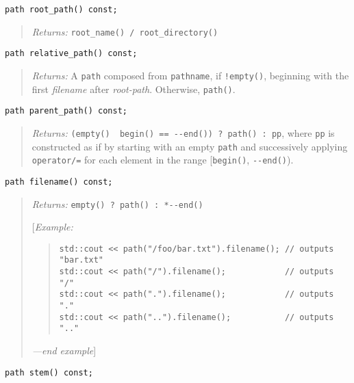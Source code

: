 \begin{verbatim}
path root_path() const;
\end{verbatim}

\begin{quote}
\emph{Returns:} \texttt{root\_name()\ /\ root\_directory()}
\end{quote}

\begin{verbatim}
path relative_path() const;
\end{verbatim}

\begin{quote}
\emph{Returns:} A \texttt{path} composed from \texttt{pathname}, if
\texttt{!empty()}, beginning with the first \emph{filename} after
\emph{root-path}. Otherwise, \texttt{path()}.
\end{quote}

\begin{verbatim}
path parent_path() const;
\end{verbatim}

\begin{quote}
\emph{Returns:}
\texttt{(empty()\ \textbar{}\textbar{}\ begin()\ ==\ -\/-end())\ ?\ path()\ :\ pp},
where \texttt{pp} is constructed as if by starting with an empty
\texttt{path} and successively applying \texttt{operator/=} for each
element in the range {[}\texttt{begin()}, \texttt{-\/-end()}).
\end{quote}

\begin{verbatim}
path filename() const;
\end{verbatim}

\begin{quote}
\emph{Returns:} \texttt{empty()\ ?\ path()\ :\ *-\/-end()}

{[}\emph{Example:}

\begin{quote}
\begin{verbatim}
std::cout << path("/foo/bar.txt").filename(); // outputs "bar.txt"
std::cout << path("/").filename();            // outputs "/"
std::cout << path(".").filename();            // outputs "."
std::cout << path("..").filename();           // outputs ".."
\end{verbatim}
\end{quote}

\emph{---end example}{]}
\end{quote}

\begin{verbatim}
path stem() const;
\end{verbatim}

